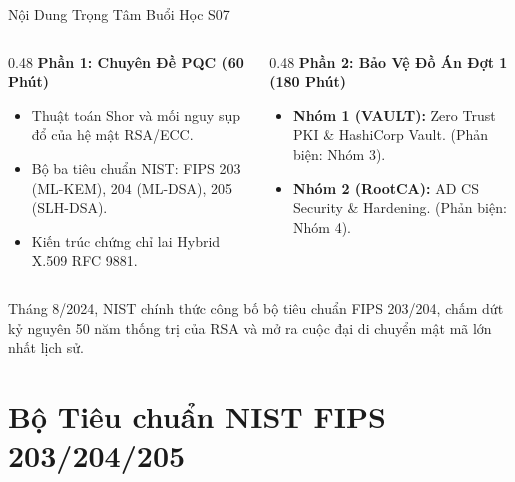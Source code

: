 \begin{frame}{Nội Dung Trọng Tâm Buổi Học S07}
  \begin{columns}[T]
    \begin{column}{0.48\textwidth}
      \textbf{Phần 1: Chuyên Đề PQC (60 Phút)}
      \begin{itemize}\small
        \item Thuật toán Shor và mối nguy sụp đổ của hệ mật RSA/ECC.
        \item Bộ ba tiêu chuẩn NIST: FIPS 203 (ML-KEM), 204 (ML-DSA), 205 (SLH-DSA).
        \item Kiến trúc chứng chỉ lai Hybrid X.509 RFC 9881.
      \end{itemize}
    \end{column}
    \begin{column}{0.48\textwidth}
      \textbf{Phần 2: Bảo Vệ Đồ Án Đợt 1 (180 Phút)}
      \begin{itemize}\small
        \item \textbf{Nhóm 1 (VAULT):} Zero Trust PKI \& HashiCorp Vault. (Phản biện: Nhóm 3).
        \item \textbf{Nhóm 2 (RootCA):} AD CS Security \& Hardening. (Phản biện: Nhóm 4).
      \end{itemize}
    \end{column}
  \end{columns}

  \begin{keybox}
    Tháng 8/2024, NIST chính thức công bố bộ tiêu chuẩn FIPS 203/204, chấm dứt kỷ nguyên 50 năm thống trị của RSA và mở ra cuộc đại di chuyển mật mã lớn nhất lịch sử.
  \end{keybox}
\end{frame}

\section{Bộ Tiêu chuẩn NIST FIPS 203/204/205}

